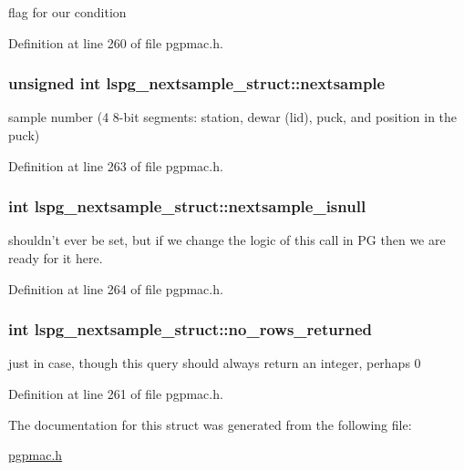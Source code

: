 flag for our condition 



Definition at line 260 of file pgpmac.\-h.

\hypertarget{structlspg__nextsample__struct_aecd82b329462ae06bc2f0d162985a086}{
\subsubsection[{nextsample}]{\setlength{\rightskip}{0pt plus 5cm}unsigned int lspg\-\_\-nextsample\-\_\-struct\-::nextsample}}\label{structlspg__nextsample__struct_aecd82b329462ae06bc2f0d162985a086}


sample number (4 8-\/bit segments\-: station, dewar (lid), puck, and position in the puck) 



Definition at line 263 of file pgpmac.\-h.

\hypertarget{structlspg__nextsample__struct_a2ca6e2a667c9fe7f1a54329de04d2a3c}{
\subsubsection[{nextsample\-\_\-isnull}]{\setlength{\rightskip}{0pt plus 5cm}int lspg\-\_\-nextsample\-\_\-struct\-::nextsample\-\_\-isnull}}\label{structlspg__nextsample__struct_a2ca6e2a667c9fe7f1a54329de04d2a3c}


shouldn't ever be set, but if we change the logic of this call in P\-G then we are ready for it here. 



Definition at line 264 of file pgpmac.\-h.

\hypertarget{structlspg__nextsample__struct_aeee8110133db9f1895237ed9b54dd873}{
\subsubsection[{no\-\_\-rows\-\_\-returned}]{\setlength{\rightskip}{0pt plus 5cm}int lspg\-\_\-nextsample\-\_\-struct\-::no\-\_\-rows\-\_\-returned}}\label{structlspg__nextsample__struct_aeee8110133db9f1895237ed9b54dd873}


just in case, though this query should always return an integer, perhaps 0 



Definition at line 261 of file pgpmac.\-h.



The documentation for this struct was generated from the following file\-:\begin{DoxyCompactItemize}
\item 
\hyperlink{pgpmac_8h}{pgpmac.\-h}\end{DoxyCompactItemize}
